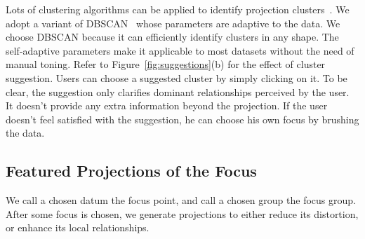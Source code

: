Lots of clustering algorithms can be applied to identify projection clusters~\cite{DBLP:conf/ieeevast/Kandogan12}. We adopt a variant of DBSCAN~\cite{zhou2012research} whose parameters are adaptive to the data. We choose DBSCAN because it can efficiently identify clusters in any shape. The self-adaptive parameters make it applicable to most datasets without the need of manual toning. Refer to Figure~\ref{fig:suggestions}(b) for the effect of cluster suggestion. Users can choose a suggested cluster by simply clicking on it. To be clear, the suggestion only clarifies dominant relationships perceived by the user. It doesn't provide any extra information beyond the projection. If the user doesn't feel satisfied with the suggestion, he can choose his own focus by brushing the data.

\subsection{Featured Projections of the Focus}
We call a chosen datum the focus point, and call a chosen group the focus group. After some focus is chosen, we generate projections to either reduce its distortion, or enhance its local relationships.

